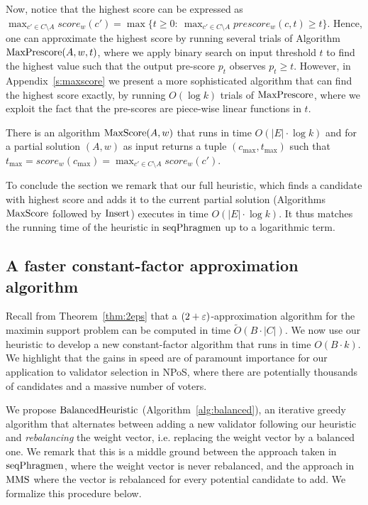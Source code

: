 Now, notice that the highest score can be expressed as $\max_{c'\in C\setminus A} score_w(c')=\max\{t\geq 0: \ \max_{c'\in C\setminus A} prescore_w(c,t)\geq t\}$. 
Hence, one can approximate the highest score by running several trials of Algorithm $\operatorname{MaxPrescore}(A,w,t)$, where we apply binary search on input threshold $t$ to find the highest value such that the output pre-score $p_t$ observes $p_t\geq t$. 
However, in Appendix~\ref{s:maxscore} we present a more sophisticated algorithm that can find the highest score exactly, by running $O(\log k)$ trials of $\operatorname{MaxPrescore}$, where we exploit the fact that the pre-scores are piece-wise linear functions in $t$.  

\begin{lemma}\label{lem:maxscore2}
There is an algorithm $\operatorname{MaxScore}(A,w)$ that runs in time $O(|E|\cdot \log k)$ and for a partial solution $(A,w)$ as input returns a tuple $(c_{\max}, t_{\max})$ such that $t_{\max}=score_w(c_{\max})=\max_{c'\in C\setminus A} score_w(c')$.
\end{lemma}

To conclude the section we remark that our full heuristic, which finds a candidate with highest score and adds it to the current partial solution (Algorithms $\operatorname{MaxScore}$ followed by $\operatorname{Insert}$) executes in time $O(|E|\cdot \log k)$. It thus matches the running time of the heuristic in $\operatorname{seqPhragmen}$ up to a logarithmic term.

\subsection{A faster constant-factor approximation algorithm}\label{s:315}

Recall from Theorem~\ref{thm:2eps} that a $(2+\varepsilon)$-approximation algorithm for the maximin support problem can be computed in time $\tilde{O}(B\cdot |C|)$. We now use our heuristic to develop a new constant-factor algorithm that runs in time $O(B\cdot k)$. We highlight that the gains in speed are of paramount importance for our application to validator selection in NPoS, where there are potentially thousands of candidates and a massive number of voters.

We propose $\operatorname{BalancedHeuristic}$ (Algorithm~\ref{alg:balanced}), an iterative greedy algorithm that alternates between adding a new validator following our heuristic and \emph{rebalancing} the weight vector, i.e. replacing the weight vector by a balanced one. We remark that this is a middle ground between the approach taken in $\operatorname{seqPhragmen}$, where the weight vector is never rebalanced, and the approach in $\operatorname{MMS}$ where the vector is rebalanced for every potential candidate to add. We formalize this procedure below.

